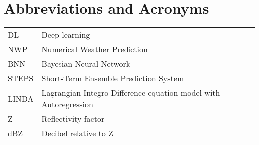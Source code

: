 \chapter*{Abbreviations and Acronyms}


\noindent
\begin{longtable}{@{}p{}p{}@{}}
DL & Deep learning \\
NWP & Numerical Weather Prediction \\
BNN & Bayesian Neural Network \\
STEPS & Short-Term Ensemble Prediction System \\
LINDA & Lagrangian Integro-Difference equation model with Autoregression\\
Z & Reflectivity factor \\
dBZ & Decibel relative to Z

\end{longtable}
